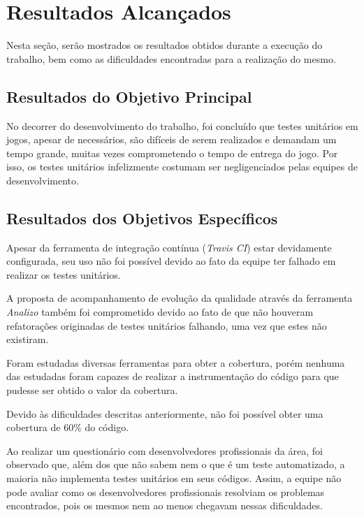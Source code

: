 \chapter[Resultados Alcançados]{Resultados Alcançados}

Nesta seção, serão mostrados os resultados obtidos durante a execução do trabalho, bem como as dificuldades encontradas para a realização do mesmo.

\section{Resultados do Objetivo Principal}

No decorrer do desenvolvimento do trabalho, foi concluído que testes unitários em jogos, apesar de necessários, são difíceis de serem realizados e demandam um tempo grande, muitas vezes comprometendo o tempo de entrega do jogo. Por isso, os testes unitários infelizmente costumam ser negligenciados pelas equipes de desenvolvimento. 

\section{Resultados dos Objetivos Específicos}

Apesar da ferramenta de integração contínua (\textit{Travis CI}) estar devidamente configurada, seu uso não foi possível devido ao fato da equipe ter falhado em realizar os testes unitários. 

A proposta de acompanhamento de evolução da qualidade através da ferramenta \textit{Analizo} também foi comprometido devido ao fato de que não houveram refatorações originadas de testes unitários falhando, uma vez que estes não existiram.

Foram estudadas diversas ferramentas para obter a cobertura, porém nenhuma das estudadas foram capazes de realizar a instrumentação do código para que pudesse ser obtido o valor da cobertura.

Devido às dificuldades descritas anteriormente, não foi possível obter uma cobertura de 60\% do código. 

Ao realizar um questionário com desenvolvedores profissionais da área, foi observado que, além dos que não sabem nem o que é um teste automatizado, a maioria não implementa testes unitários em seus códigos. Assim, a equipe não pode avaliar como os desenvolvedores profissionais resolviam os problemas encontrados, pois os mesmos nem ao menos chegavam nessas dificuldades.
